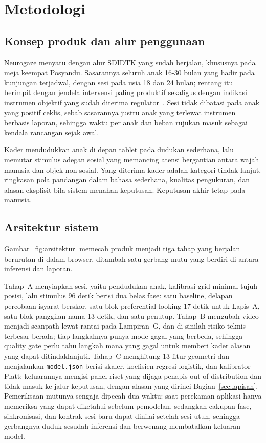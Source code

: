 \documentclass{article}
\begin{document}
\section{Metodologi}

\subsection{Konsep produk dan alur penggunaan}

Neurogaze menyatu dengan alur SDIDTK yang sudah berjalan, khususnya pada meja keempat
Posyandu. Sasarannya seluruh anak 16-30 bulan yang hadir pada kunjungan terjadwal, dengan
sesi pada usia 18 dan 24 bulan; rentang itu berimpit dengan jendela intervensi paling
produktif sekaligus dengan indikasi instrumen objektif yang sudah diterima
regulator~\cite{fda2022}. Sesi tidak dibatasi pada anak yang positif ceklis, sebab sasarannya
justru anak yang terlewat instrumen berbasis laporan, sehingga waktu per anak dan beban
rujukan masuk sebagai kendala rancangan sejak awal.

Kader mendudukkan anak di depan tablet pada dudukan sederhana, lalu memutar stimulus adegan
sosial yang memancing atensi bergantian antara wajah manusia dan objek non-sosial. Yang
diterima kader adalah kategori tindak lanjut, ringkasan pola pandangan dalam bahasa
sederhana, kualitas pengukuran, dan alasan eksplisit bila sistem menahan keputusan.
Keputusan akhir tetap pada manusia.

\subsection{Arsitektur sistem}

Gambar~\ref{fig:arsitektur} memecah produk menjadi tiga tahap yang berjalan berurutan di
dalam browser, ditambah satu gerbang mutu yang berdiri di antara inferensi dan laporan.

Tahap~A menyiapkan sesi, yaitu pendudukan anak, kalibrasi grid minimal tujuh posisi, lalu
stimulus 96 detik berisi dua belas fase: satu baseline, delapan percobaan isyarat
berskor, satu blok preferential-looking 17 detik untuk Lapis~A, satu blok panggilan nama
13 detik, dan satu penutup. Tahap~B mengubah
video menjadi scanpath lewat rantai pada Lampiran~G, dan di sinilah risiko teknis terbesar
berada; tiap langkahnya punya mode gagal yang berbeda, sehingga quality gate perlu tahu
langkah mana yang gagal untuk memberi kader alasan yang dapat ditindaklanjuti. Tahap~C
menghitung 13 fitur geometri dan menjalankan \texttt{model.json} berisi skaler, koefisien
regresi logistik, dan kalibrator Platt; keluarannya mengisi panel riset yang dijaga penapis
out-of-distribution dan tidak masuk ke jalur keputusan, dengan alasan yang dirinci
Bagian~\ref{sec:lapisan}. Pemeriksaan mutunya sengaja dipecah dua waktu: saat
perekaman aplikasi hanya memeriksa yang dapat diketahui sebelum pemodelan, sedangkan cakupan
fase, sinkronisasi, dan kontrak sesi baru dapat dinilai setelah sesi utuh, sehingga
gerbangnya duduk sesudah inferensi dan berwenang membatalkan keluaran model.
\end{document}
